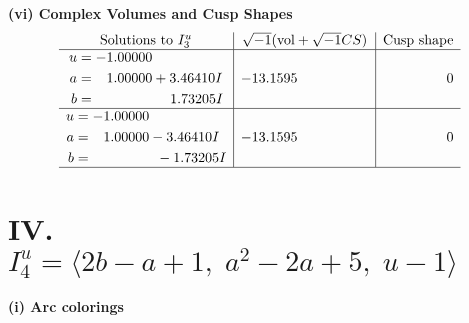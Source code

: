 \documentclass[1p]{elsarticle_modified}
\theoremstyle{definition}
\newcommand{\I}{\sqrt{-1}}
\begin{document}
\newpage\flushleft \textbf{(vi) Complex Volumes and Cusp Shapes}
$$\begin{array}{c|c|c}  
\text{Solutions to }I^u_{3}& \I (\text{vol} + \sqrt{-1}CS) & \text{Cusp shape}\\
 \hline 
\begin{aligned}
u &= -1.00000\phantom{ +0.000000I} \\
a &= \phantom{-}1.00000 + 3.46410 I \\
b &= \phantom{-0.000000 -}1.73205 I\end{aligned}
 & -13.1595\phantom{ +0.000000I} & \phantom{-0.000000 } 0 \\ \hline\begin{aligned}
u &= -1.00000\phantom{ +0.000000I} \\
a &= \phantom{-}1.00000 - 3.46410 I \\
b &= \phantom{-0.000000 } -1.73205 I\end{aligned}
 & -13.1595\phantom{ +0.000000I} & \phantom{-0.000000 } 0\\
 \hline 
 \end{array}$$\newpage\newpage\renewcommand{\arraystretch}{1}
\centering \section*{IV. $I^u_{4}= \langle 2 b- a+1,\;a^2-2 a+5,\;u-1 \rangle$}
\flushleft \textbf{(i) Arc colorings}\\
\end{document}
